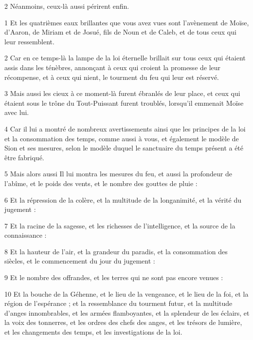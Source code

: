 \par 2 Néanmoins, ceux-là aussi périrent enfin.


\par 1 Et les quatrièmes eaux brillantes que vous avez vues sont l'avènement de Moïse, d'Aaron, de Miriam et de Josué, fils de Noun et de Caleb, et de tous ceux qui leur ressemblent.

\par 2 Car en ce temps-là la lampe de la loi éternelle brillait sur tous ceux qui étaient assis dans les ténèbres, annonçant à ceux qui croient la promesse de leur récompense, et à ceux qui nient, le tourment du feu qui leur est réservé.

\par 3 Mais aussi les cieux à ce moment-là furent ébranlés de leur place, et ceux qui étaient sous le trône du Tout-Puissant furent troublés, lorsqu'il emmenait Moïse avec lui.

\par 4 Car il lui a montré de nombreux avertissements ainsi que les principes de la loi et la consommation des temps, comme aussi à vous, et également le modèle de Sion et ses mesures, selon le modèle duquel le sanctuaire du temps présent a été être fabriqué.

\par 5 Mais alors aussi Il lui montra les mesures du feu, et aussi la profondeur de l'abîme, et le poids des vents, et le nombre des gouttes de pluie :

\par 6 Et la répression de la colère, et la multitude de la longanimité, et la vérité du jugement :

\par 7 Et la racine de la sagesse, et les richesses de l'intelligence, et la source de la connaissance :

\par 8 Et la hauteur de l'air, et la grandeur du paradis, et la consommation des siècles, et le commencement du jour du jugement :

\par 9 Et le nombre des offrandes, et les terres qui ne sont pas encore venues :

\par 10 Et la bouche de la Géhenne, et le lieu de la vengeance, et le lieu de la foi, et la région de l'espérance ; et la ressemblance du tourment futur, et la multitude d'anges innombrables, et les armées flamboyantes, et la splendeur de les éclairs, et la voix des tonnerres, et les ordres des chefs des anges, et les trésors de lumière, et les changements des temps, et les investigations de la loi.

